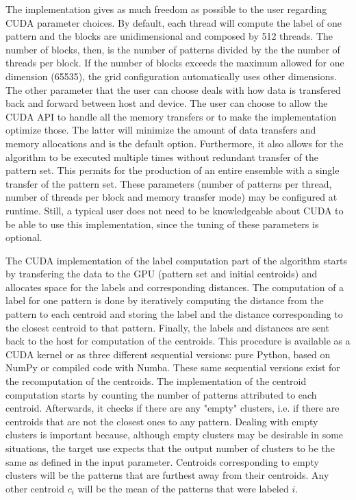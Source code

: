 The implementation gives as much freedom as possible to the user regarding CUDA parameter choices.
By default, each thread will compute the label of one pattern and the blocks are unidimensional and composed by 512 threads.
The number of blocks, then, is the number of patterns divided by the the number of threads per block.
If the number of blocks exceeds the maximum allowed for one dimension (65535), the grid configuration automatically uses other dimensions.
The other parameter that the user can choose deals with how data is transfered back and forward between host and device.
The user can choose to allow the CUDA API to handle all the memory transfers or to make the implementation optimize those.
The latter will minimize the amount of data transfers and memory allocations and is the default option.
Furthermore, it also allows for the algorithm to be executed multiple times without redundant transfer of the pattern set.
This permits for the production of an entire ensemble with a single transfer of the pattern set.
These parameters (number of patterns per thread, number of threads per block and memory transfer mode) may be configured at runtime.
Still, a typical user does not need to be knowledgeable about CUDA to be able to use this implementation, since the tuning of these parameters is optional.

The CUDA implementation of the label computation part of the algorithm starts by transfering the data to the GPU (pattern set and initial centroids) and allocates space for the labels and corresponding distances.
The computation of a label for one pattern is done by iteratively computing the distance from the pattern to each centroid and storing the label and the distance corresponding to the closest centroid to that pattern.
Finally, the labels and distances are sent back to the host for computation of the centroids.
This procedure is available as a CUDA kernel or as three different sequential versions: pure Python, based on NumPy or compiled code with Numba.
These same sequential versions exist for the recomputation of the centroids.
The implementation of the centroid computation starts by counting the number of patterns attributed to each centroid.
Afterwards, it checks if there are any "empty" clusters, i.e. if there are centroids that are not the closest ones to any pattern.
Dealing with empty clusters is important because, although empty clusters may be desirable in some situations, the target use expects that the output number of clusters to be the same as defined in the input parameter.
Centroids corresponding to empty clusters will be the patterns that are furthest away from their centroids.
Any other centroid $c_i$ will be the mean of the patterns that were labeled $i$.


